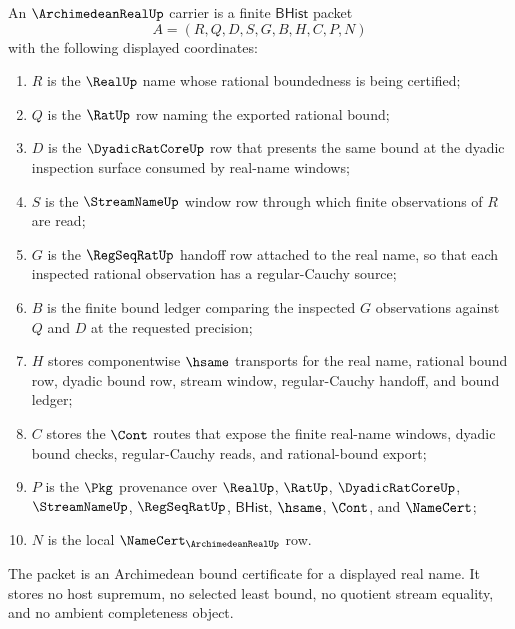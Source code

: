 \begin{definition}
\label{def:archimedean-real-carrier}
An $\ArchimedeanRealUp$ carrier is a finite $\mathsf{BHist}$ packet
$$
A=(R,Q,D,S,G,B,H,C,P,N)
$$
with the following displayed coordinates:
\begin{enumerate}
\item $R$ is the $\RealUp$ name whose rational boundedness is being certified;
\item $Q$ is the $\RatUp$ row naming the exported rational bound;
\item $D$ is the $\DyadicRatCoreUp$ row that presents the same bound at the dyadic inspection surface consumed by real-name windows;
\item $S$ is the $\StreamNameUp$ window row through which finite observations of $R$ are read;
\item $G$ is the $\RegSeqRatUp$ handoff row attached to the real name, so that each inspected rational observation has a regular-Cauchy source;
\item $B$ is the finite bound ledger comparing the inspected $G$ observations against $Q$ and $D$ at the requested precision;
\item $H$ stores componentwise $\hsame$ transports for the real name, rational bound row, dyadic bound row, stream window, regular-Cauchy handoff, and bound ledger;
\item $C$ stores the $\Cont$ routes that expose the finite real-name windows, dyadic bound checks, regular-Cauchy reads, and rational-bound export;
\item $P$ is the $\Pkg$ provenance over $\RealUp$, $\RatUp$, $\DyadicRatCoreUp$, $\StreamNameUp$, $\RegSeqRatUp$, $\mathsf{BHist}$, $\hsame$, $\Cont$, and $\NameCert$;
\item $N$ is the local $\NameCert_{\ArchimedeanRealUp}$ row.
\end{enumerate}
The packet is an Archimedean bound certificate for a displayed real name. It stores no host supremum, no selected least bound, no quotient stream equality, and no ambient completeness object.
\end{definition}


